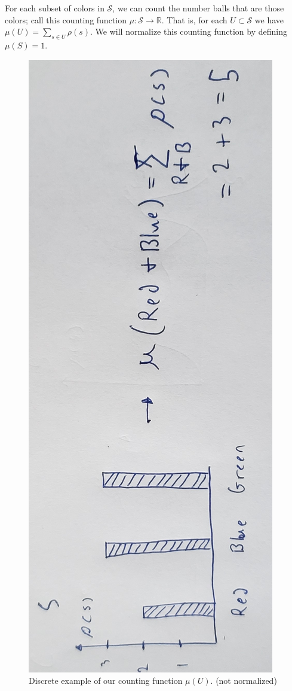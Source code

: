 \documentclass{article}
\begin{document}
	For each subset of colors in $\mathcal{S}$, we can count the number balls that are those colors; call this counting function $\mu : \mathcal{S} \to \mathbb{R}$. That is, for each $U \subset \mathcal{S}$ we have $\mu(U) = \sum_{s \in U} \rho(s)$. We will normalize this counting function by defining $\mu(S) = 1$.
	
\begin{figure}[!ht]
\centerline{\includegraphics[width=\textwidth,angle=-90,scale=.35]{diagram3.jpg}}
\caption{Discrete example of our counting function $\mu(U)$. (not normalized)}
\end{figure}
	
\end{document}
